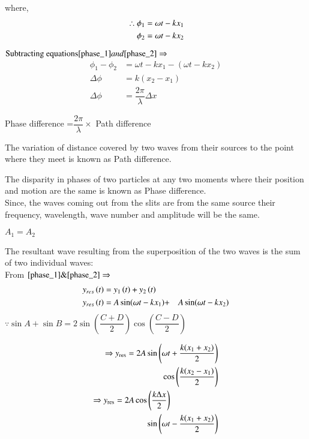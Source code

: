 \documentclass[journal,12pt,twocolumn]{IEEEtran}
\theoremstyle{remark}
\begin{document}
where,
\begin{align}
 \therefore \phi_1 &= \omega t - kx_1 \\
\hspace*{0.4cm} \phi_2 &= \omega t - kx_2 
\end{align}

$ \text{Subtracting equations} \eqref{phase_1} and \eqref{phase_2} \Rightarrow{}$
\begin{align}
   \phi_1 - \phi_2 &= \omega t - kx_1 -( \omega t - kx_2 ) \nonumber \\ 
   \Delta \phi &= k(x_2 - x_1) \nonumber \\ 
    \Delta \phi &= \dfrac{2\pi}{\lambda}\Delta x  \label{relation }
\end{align}

\hspace{0.3cm} Phase difference =$\dfrac{2\pi}{\lambda} \times$ Path difference

\vspace{0.2cm}

The variation of distance covered by two waves from their sources to the point where they meet is known as Path difference.

The disparity in phases of two particles at any two moments where their position and motion are the same is known as Phase difference. \\
\hspace*{0.8cm} Since, the waves coming out from the slits are from the same source their frequency, wavelength, wave number and amplitude will be the same. 
\begin{center}
    $A_1 = A_2$ \\
\end{center} 
The resultant wave resulting from the superposition of the two waves is the sum of two individual waves: \\
From $\eqref{phase_1} \& \eqref{phase_2} \Rightarrow$
\begin{align}
y_{res}\left(t\right) &= y_1\left(t\right) + y_2\left(t\right)  \\
y_{res}\left(t\right) &= A\sin({\omega t - kx_1})  + &A\sin({ \omega t - kx_2}) \nonumber 
\end{align}
 $ \because \sin{A} + \sin{B} = 2\sin\left(\dfrac{C+D}{2}\right) \cos\left(\dfrac{C-D}{2}\right) $ 
 
\begin{align}
\Rightarrow y_\text{res} =  2A\sin\left( \omega t+\dfrac{k(x_1+x_2)}{2} \right) \nonumber \\
\quad\cos\left(\dfrac{k(x_2 - x_1)}{2}\right) \\
 \Rightarrow y_\text{res} =  2A\cos\left(\dfrac{k\Delta x}{2}\right) \nonumber \hspace*{2cm} \\ \quad \sin\left(\omega t - \dfrac{k(x_1+x_2)}{2} \right) 
 \end{align}
\end{document}
